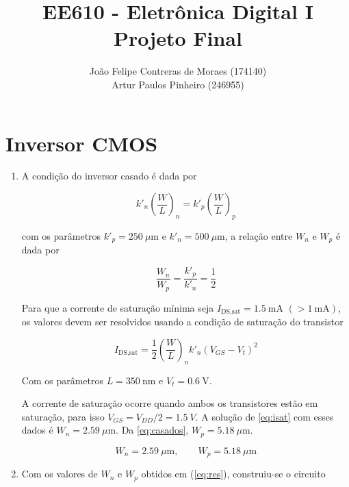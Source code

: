 \documentclass[11pt]{article}
\title{\vspace{-2cm}\blue EE610 - Eletrônica Digital I
 \\
\blueb Projeto Final}
\author{João Felipe Contreras de Moraes (174140)\\
Artur Paulos Pinheiro (246955)}
\date{}
\begin{document}
\maketitle

\section{Inversor CMOS}

\begin{enumerate}[label=\alph*)]
\item A condição do inversor casado é dada por

\begin{equation}
    k'_n\left(\frac{W}{L}\right)_n = k'_p\left(\frac{W}{L}\right)_p
\end{equation}

com os parâmetros $k'_p = 250\ \mu\text{m}$ e $k'_n = 500\ \mu\text{m}$, a relação entre $W_n$ e $W_p$ é dada por

\begin{equation}\label{eq:casados}
    \frac{W_n}{W_p} = \frac{k'_p}{k'_n} = \frac{1}{2}
\end{equation}

Para que a corrente de saturação mínima seja $I_\text{DS,sat} = 1.5\ \text{mA}$ $(> 1\ \text{mA})$, os valores devem ser resolvidos usando a condição de saturação do transistor

\begin{equation}\label{eq:isat}
    I_\text{DS,sat} = \frac{1}{2}\left(\frac{W}{L}\right)_n k'_n(V_{GS} - V_{t})^2
\end{equation}

Com os parâmetros $L=350\ \text{nm}$ e $V_t = 0.6\ \text{V}$. 

A corrente de saturação ocorre quando ambos os transistores estão em saturação, para isso $V_{GS} = V_{DD}/2 = 1.5\ V$. A solução de \cref{eq:isat} com esses dados é $W_n = 2.59\ \mu\text{m}$. Da \cref{eq:casados}, $W_p = 5.18\ \mu\text{m}$.

\begin{equation}\label{eq:res}
    W_n = 2.59\ \mu\text{m},\qquad W_p = 5.18\ \mu\text{m}
\end{equation}

\item Com os valores de $W_n$ e $W_p$ obtidos em (\ref{eq:res}), construiu-se o circuito 


\end{enumerate}
\end{document}
